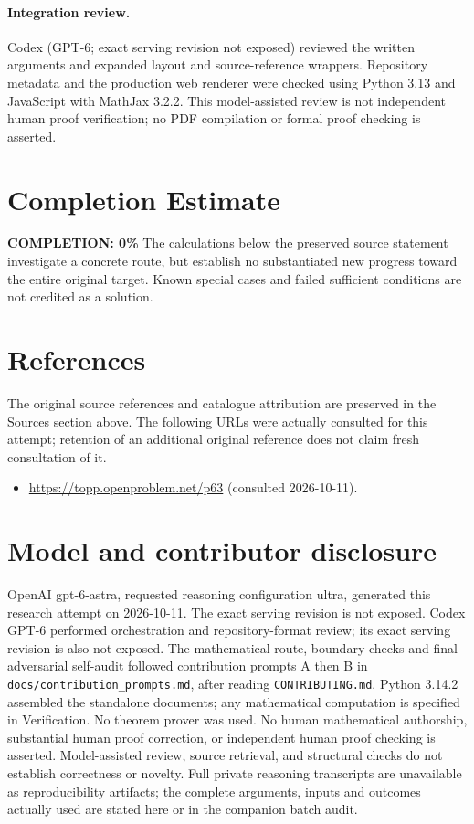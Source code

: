 \documentclass[11pt,a4paper]{article}
\begin{document}
\paragraph{Integration review.} Codex (GPT-6; exact serving revision not exposed) reviewed the written arguments and expanded layout and source-reference wrappers. Repository metadata and the production web renderer were checked using Python 3.13 and JavaScript with MathJax 3.2.2. This model-assisted review is not independent human proof verification; no PDF compilation or formal proof checking is asserted.

\section{Completion Estimate}
\noindent\textbf{COMPLETION: 0\%}
The calculations below the preserved source statement investigate a concrete route,
but establish no substantiated new progress toward the entire original target.
Known special cases and failed sufficient conditions are not credited as a solution.
\section{References}
The original source references and catalogue attribution are preserved in the
Sources section above. The following URLs were actually consulted for this attempt;
retention of an additional original reference does not claim fresh consultation of it.
\begin{itemize}
\item \url{https://topp.openproblem.net/p63} (consulted 2026-10-11). 
\end{itemize}
\section{Model and contributor disclosure}
OpenAI gpt-6-astra, requested reasoning configuration ultra, generated this research
attempt on 2026-10-11. The exact serving revision is not exposed. Codex GPT-6
performed orchestration and repository-format review; its exact serving revision
is also not exposed. The mathematical route, boundary checks and final adversarial
self-audit followed contribution prompts A then B in
\texttt{docs/contribution\_prompts.md}, after reading \texttt{CONTRIBUTING.md}.
Python 3.14.2 assembled the standalone documents; any mathematical computation is
specified in Verification. No theorem prover was used. No human mathematical
authorship, substantial human proof correction, or independent human proof checking
is asserted. Model-assisted review, source retrieval, and structural checks do not
establish correctness or novelty. Full private reasoning transcripts are unavailable
as reproducibility artifacts; the complete arguments, inputs and outcomes actually
used are stated here or in the companion batch audit.
\end{document}
